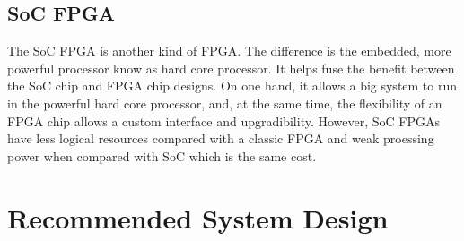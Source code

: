 \documentclass[12pt,article]{memoir}
\begin{document}
\section{SoC FPGA}
The SoC FPGA is another kind of FPGA. The difference is the embedded, more powerful processor know as hard core processor. It helps fuse the benefit between the SoC chip and FPGA chip designs.\cite{blog:socFPGA} On one hand, it allows a big system to run in the powerful hard core processor, and, at the same time, the flexibility of an FPGA chip allows a custom interface and upgradibility. However, SoC FPGAs have less logical resources compared with a classic FPGA and weak proessing power when compared with SoC which is the same cost.
\newpage
\chapter{Recommended System Design}
\end{document}
